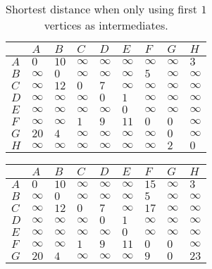 \begin{solution}
\begin{table}[H]
    \centering
\begin{tabular}{|l|l|l|l|l|l|l|l|l|}
\hline
 & $A$ & $B$ & $C$ & $D$ & $E$ & $F$ & $G$ & $H$ \\ \hline
$A$ & $0$ & $10$ & $\infty$ & $\infty$ & $\infty$ & $\infty$ & $\infty$ & $3$ \\ \hline
$B$    & $\infty$ & $0$ & $\infty$ & $\infty$ & $\infty$ & $5$ & $\infty$ & $\infty$ \\ \hline
$C$    & $\infty$ & $12$ & $0$ & $7$ & $\infty$ & $\infty$ & $\infty$ & $\infty$ \\ \hline
$D$    & $\infty$ & $\infty$ & $\infty$ & $0$ & $1$ & $\infty$ & $\infty$ & $\infty$ \\ \hline
$E$    & $\infty$ & $\infty$ & $\infty$ & $\infty$ & $0$ & $\infty$ & $\infty$ & $\infty$ \\ \hline
$F$    & $\infty$ & $\infty$ & $1$ & $9$ & $11$ & $0$ & $0$ & $\infty$ \\ \hline
$G$    & $20$ & $4$ & $\infty$ & $\infty$ & $\infty$ & $\infty$ & $0$ & $\infty$ \\ \hline
$H$    & $\infty$ & $\infty$ & $\infty$ & $\infty$ & $\infty$ & $\infty$ & $2$ & $0$ \\ \hline
\end{tabular}
\caption{Shortest distance when only using first $1$ vertices as intermediates.}
\end{table}
\begin{table}[H]
    \centering
\begin{tabular}{|l|l|l|l|l|l|l|l|l|}
\hline
 & $A$ & $B$ & $C$ & $D$ & $E$ & $F$ & $G$ & $H$ \\ \hline
$A$ & $0$ & $10$ & $\infty$ & $\infty$ & $\infty$ & $15$ & $\infty$ & $3$ \\ \hline
$B$    & $\infty$ & $0$ & $\infty$ & $\infty$ & $\infty$ & $5$ & $\infty$ & $\infty$ \\ \hline
$C$    & $\infty$ & $12$ & $0$ & $7$ & $\infty$ & $17$ & $\infty$ & $\infty$ \\ \hline
$D$    & $\infty$ & $\infty$ & $\infty$ & $0$ & $1$ & $\infty$ & $\infty$ & $\infty$ \\ \hline
$E$    & $\infty$ & $\infty$ & $\infty$ & $\infty$ & $0$ & $\infty$ & $\infty$ & $\infty$ \\ \hline
$F$    & $\infty$ & $\infty$ & $1$ & $9$ & $11$ & $0$ & $0$ & $\infty$ \\ \hline
$G$    & $20$ & $4$ & $\infty$ & $\infty$ & $\infty$ & $9$ & $0$ & $23$ \\ \hline

\end{tabular}
\end{table}
\end{solution}
